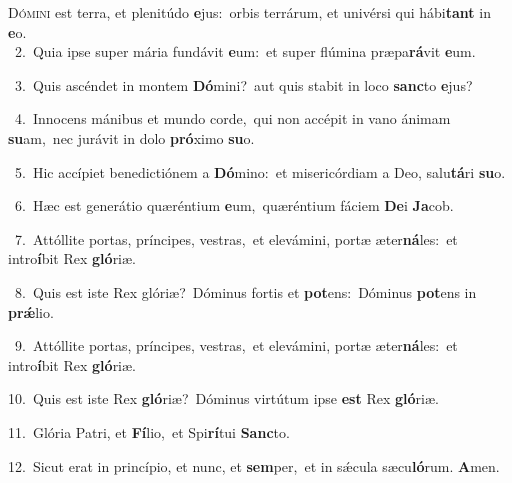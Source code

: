 \lettrine{\initial\textcolor{\initialcolor}{D}}{ómini} est terra, et plenitúdo \textbf{e}\-jus:~\star orbis terrárum, et univérsi qui hábi\textbf{tant} in \textbf{e}\-o.\\
{\numbfont\textcolor{\numbcolor}{~2.}}~Quia ipse super mária fundávit \textbf{e}\-um:~\star et super flúmina præpa\-\textbf{rá}\-vit \textbf{e}\-um.\par
{\numbfont\textcolor{\numbcolor}{~3.}}~Quis ascéndet in montem \textbf{Dó}\-mini?~\star aut quis stabit in loco \textbf{sanc}\-to \textbf{e}\-jus?\par
{\numbfont\textcolor{\numbcolor}{~4.}}~Innocens mánibus et mundo corde,~\dagger qui non accépit in vano ánimam \textbf{su}\-am,~\star nec jurávit in dolo \textbf{pró}\-ximo \textbf{su}\-o.\par
{\numbfont\textcolor{\numbcolor}{~5.}}~Hic accípiet benedictiónem a \textbf{Dó}\-mino:~\star et misericórdiam a Deo, salu\-\textbf{tá}\-ri \textbf{su}\-o.\par
{\numbfont\textcolor{\numbcolor}{~6.}}~Hæc est generátio quæréntium \textbf{e}\-um,~\star quæréntium fáciem \textbf{De}\-i \textbf{Ja}\-cob.\par
{\numbfont\textcolor{\numbcolor}{~7.}}~Attóllite portas, príncipes, vestras,~\dagger et elevámini, portæ æter\-\textbf{ná}\-les:~\star et intro\-\textbf{í}\-bit Rex \textbf{gló}\-riæ.\par
{\numbfont\textcolor{\numbcolor}{~8.}}~Quis est iste Rex glóriæ?~\dagger Dóminus fortis et \textbf{pot}\-ens:~\star Dóminus \textbf{pot}\-ens in \textbf{prǽ}\-lio.\par
{\numbfont\textcolor{\numbcolor}{~9.}}~Attóllite portas, príncipes, vestras,~\dagger et elevámini, portæ æter\-\textbf{ná}\-les:~\star et intro\-\textbf{í}\-bit Rex \textbf{gló}\-riæ.\par
{\numbfont\textcolor{\numbcolor}{10.}}~Quis est iste Rex \textbf{gló}\-riæ?~\star Dóminus virtútum ipse \textbf{est} Rex \textbf{gló}\-riæ.\par
{\numbfont\textcolor{\numbcolor}{11.}}~Glória Patri, et \textbf{Fí}\-lio,~\star et Spi\-\textbf{rí}\-tui \textbf{Sanc}\-to.\par
{\numbfont\textcolor{\numbcolor}{12.}}~Sicut erat in princípio, et nunc, et \textbf{sem}\-per,~\star et in sǽcula sæcu\-\textbf{ló}\-rum. \textbf{A}\-men.\par
